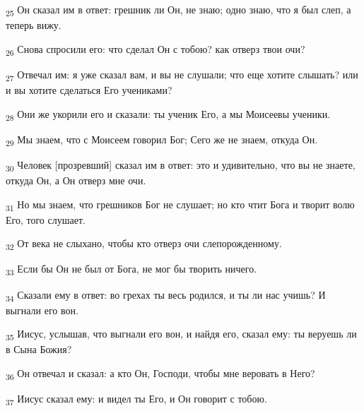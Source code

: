 \begin{tcolorbox}
\textsubscript{25} Он сказал им в ответ: грешник ли Он, не знаю; одно знаю, что я был слеп, а теперь вижу.
\end{tcolorbox}
\begin{tcolorbox}
\textsubscript{26} Снова спросили его: что сделал Он с тобою? как отверз твои очи?
\end{tcolorbox}
\begin{tcolorbox}
\textsubscript{27} Отвечал им: я уже сказал вам, и вы не слушали; что еще хотите слышать? или и вы хотите сделаться Его учениками?
\end{tcolorbox}
\begin{tcolorbox}
\textsubscript{28} Они же укорили его и сказали: ты ученик Его, а мы Моисеевы ученики.
\end{tcolorbox}
\begin{tcolorbox}
\textsubscript{29} Мы знаем, что с Моисеем говорил Бог; Сего же не знаем, откуда Он.
\end{tcolorbox}
\begin{tcolorbox}
\textsubscript{30} Человек [прозревший] сказал им в ответ: это и удивительно, что вы не знаете, откуда Он, а Он отверз мне очи.
\end{tcolorbox}
\begin{tcolorbox}
\textsubscript{31} Но мы знаем, что грешников Бог не слушает; но кто чтит Бога и творит волю Его, того слушает.
\end{tcolorbox}
\begin{tcolorbox}
\textsubscript{32} От века не слыхано, чтобы кто отверз очи слепорожденному.
\end{tcolorbox}
\begin{tcolorbox}
\textsubscript{33} Если бы Он не был от Бога, не мог бы творить ничего.
\end{tcolorbox}
\begin{tcolorbox}
\textsubscript{34} Сказали ему в ответ: во грехах ты весь родился, и ты ли нас учишь? И выгнали его вон.
\end{tcolorbox}
\begin{tcolorbox}
\textsubscript{35} Иисус, услышав, что выгнали его вон, и найдя его, сказал ему: ты веруешь ли в Сына Божия?
\end{tcolorbox}
\begin{tcolorbox}
\textsubscript{36} Он отвечал и сказал: а кто Он, Господи, чтобы мне веровать в Него?
\end{tcolorbox}
\begin{tcolorbox}
\textsubscript{37} Иисус сказал ему: и видел ты Его, и Он говорит с тобою.
\end{tcolorbox}
